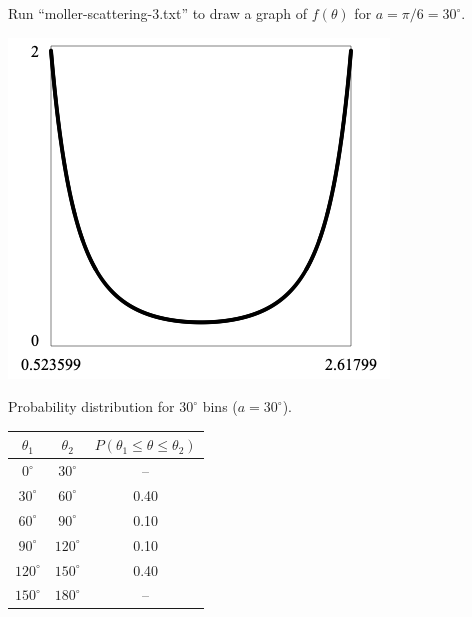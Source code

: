 \documentclass[12pt]{article}
\begin{document}
\noindent
Run ``moller-scattering-3.txt'' to draw a graph of $f(\theta)$ for $a=\pi/6=30^\circ$.

\begin{center}
\includegraphics[scale=0.5]{moller-scattering.png}
\end{center}

\noindent
Probability distribution for $30^\circ$ bins ($a=30^\circ$).
\begin{center}
\begin{tabular}{|c|c|c|}
\hline
$\theta_1$ & $\theta_2$ & $P(\theta_1\le\theta\le\theta_2)$\\
\hline
$0^\circ$ & $30^\circ$ & -- \\
$30^\circ$ & $60^\circ$ & 0.40 \\
$60^\circ$ & $90^\circ$ & 0.10 \\
$90^\circ$ & $120^\circ$ & 0.10 \\
$120^\circ$ & $150^\circ$ & 0.40 \\
$150^\circ$ & $180^\circ$ & -- \\
\hline
\end{tabular}
\end{center}
\end{document}
